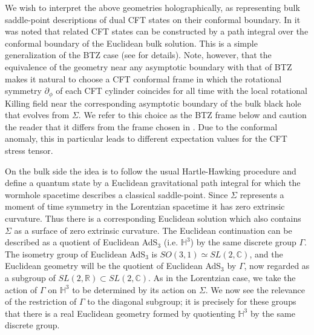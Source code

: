 \documentclass[12pt]{article}
\newcommand{\RR}{\mathbb{R}} %
\newcommand{\HH}{\mathbb{H}}
\numberwithin{equation}{section}
\begin{document}
We wish to interpret the above geometries holographically, as representing bulk saddle-point descriptions of dual CFT states on their conformal boundary. In \cite{Maldacena:2001kr} it was noted that related CFT states can be constructed by a path integral over the conformal boundary of the Euclidean bulk solution. This is a simple generalization of the BTZ case (see \cite{Skenderis:2009ju} for details).  Note, however, that the equivalence of the geometry near any asymptotic boundary with that of BTZ makes it natural to choose a CFT conformal frame in which the rotational symmetry $\partial_\phi$ of each CFT cylinder coincides for all time with the local rotational Killing field near the corresponding asymptotic boundary of the bulk black hole that evolves from $\Sigma$.  We refer to this choice as the BTZ frame below and caution the reader that it differs from the frame chosen in \cite{Skenderis:2009ju}.  Due to the conformal anomaly, this in particular leads to different expectation values for the CFT stress tensor.

On the bulk side the idea is to follow the usual Hartle-Hawking procedure and define a quantum state by a Euclidean gravitational path integral for which the wormhole spacetime describes a classical saddle-point. Since $\Sigma$ represents a moment of time symmetry in the Lorentzian spacetime it has zero extrinsic curvature.  Thus there is a corresponding Euclidean solution which also contains $\Sigma$ as a surface of zero extrinsic curvature. The Euclidean continuation can be described as a quotient of Euclidean AdS${}_3$ (i.e. $\HH^3$) by the same discrete group $\Gamma$.  The isometry group of Euclidean AdS${}_3$ is $SO(3,1)\simeq SL(2,\mathbb{C})$, and the Euclidean geometry will be the quotient of Euclidean AdS${}_3$ by $\Gamma$, now regarded as a subgroup of $SL(2, \RR) \subset SL(2,\mathbb{C})$. As in the Lorentzian case, we take the action of $\Gamma$ on $\HH^3$ to be determined by its action on $\Sigma$.  We now see the relevance of the restriction of $\Gamma$ to the diagonal subgroup; it is precisely for these groups that there is a real Euclidean geometry formed by quotienting $\HH^3$ by the same discrete group.
\end{document}
